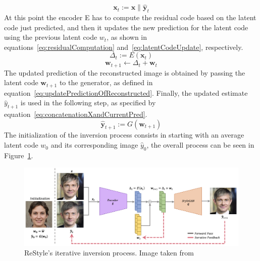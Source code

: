 \begin{equation}
\label{eq:concatenationXandCurrentPred}
    \textbf{x}_t := \textbf{x} \| \hat{\textbf{y}}_t
\end{equation}
At this point the encoder E has to compute the residual code based on the latent code just predicted, and then it updates the new prediction for the latent code using the previous latent code $w_t$, as shown in equations~\ref{eq:residualComputation} and~\ref{eq:latentCodeUpdate}, respectively.
\begin{equation}
    \label{eq:residualComputation}
    \Delta_t := E(\textbf{x}_t)
\end{equation}
\begin{equation}
    \label{eq:latentCodeUpdate}
    \textbf{w}_{t+1} \xleftarrow{} \Delta_t + \textbf{w}_t
\end{equation}
The updated prediction of the reconstructed image is obtained by passing the latent code $\textbf{w}_{t+1}$ to the generator, as defined in equation~\ref{eq:updatePredictionOfReconstructed}. Finally, the updated estimate $\hat{y}_{t+1}$ is used in the following step, as specified by equation~\ref{eq:concatenationXandCurrentPred}.
\begin{equation}
    \label{eq:updatePredictionOfReconstructed}
    \hat{\textbf{y}}_{t+1} := G(\textbf{w}_{t+1})
\end{equation}
The initialization of the inversion process consists in starting with an average latent code $w_0$ and its corresponding image $\hat{y}_0$, the overall process can be seen in Figure~\ref{fig:ReStyle inversion scheme}.
 \begin{figure}[htbp]
\centering
  \includegraphics[scale=0.3]{figures/restyle-inversionScheme.png}
  \caption{ReStyle's iterative inversion process. Image taken from~\cite{alaluf2021restyle}}
  \label{fig:ReStyle inversion scheme}
\end{figure}

